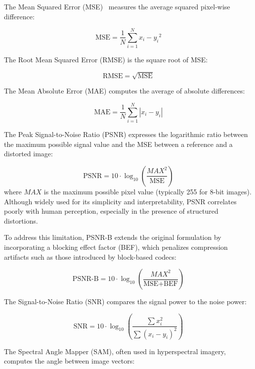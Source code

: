 The Mean Squared Error (MSE)~\cite{gonzalez2002digital} measures the average squared pixel-wise difference:

\begin{equation}
\text{MSE} = \frac{1}{N} \sum_{i=1}^{N} {x_i - y_i}^2
\end{equation}

The Root Mean Squared Error (RMSE) is the square root of MSE:\@

\begin{equation}
\text{RMSE} = \sqrt{\text{MSE}}
\end{equation}

The Mean Absolute Error (MAE) computes the average of absolute differences:

\begin{equation}
\text{MAE} = \frac{1}{N} \sum_{i=1}^{N} |x_i - y_i|
\end{equation}

The Peak Signal-to-Noise Ratio (PSNR) expresses the logarithmic ratio between the maximum possible signal value and the MSE between a reference and a distorted image:

\begin{equation}
\text{PSNR} = 10 \cdot \log_{10} \left( \frac{MAX^2}{\text{MSE}} \right)
\end{equation}
where $MAX$ is the maximum possible pixel value (typically 255 for 8-bit images). Although widely used for its simplicity and interpretability, PSNR correlates poorly with human perception, especially in the presence of structured distortions. 

To address this limitation, PSNR-B extends the original formulation by incorporating a blocking effect factor (BEF), which penalizes compression artifacts such as those introduced by block-based codecs:

\begin{equation}
\text{PSNR-B} = 10 \cdot \log_{10} \left( \frac{MAX^2}{\text{MSE} + \text{BEF}} \right)
\end{equation}

The Signal-to-Noise Ratio (SNR) compares the signal power to the noise power:

\begin{equation}
\text{SNR} = 10 \cdot \log_{10} \left( \frac{\sum x_i^2}{\sum {(x_i - y_i)}^2} \right)
\end{equation}

The Spectral Angle Mapper (SAM), often used in hyperspectral imagery, computes the angle between image vectors:

